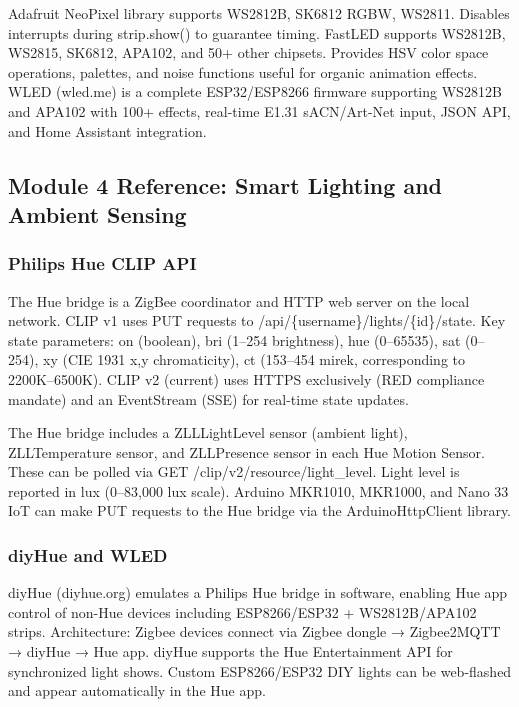 \documentclass[11pt,letterpaper]{article}
\begin{document}
Adafruit NeoPixel library supports WS2812B, SK6812 RGBW, WS2811. Disables interrupts during strip.show() to guarantee timing. FastLED supports WS2812B, WS2815, SK6812, APA102, and 50+ other chipsets. Provides HSV color space operations, palettes, and noise functions useful for organic animation effects. WLED (wled.me) is a complete ESP32/ESP8266 firmware supporting WS2812B and APA102 with 100+ effects, real-time E1.31 sACN/Art-Net input, JSON API, and Home Assistant integration.

\subsection{Module 4 Reference: Smart Lighting and Ambient Sensing}

\subsubsection{Philips Hue CLIP API}

The Hue bridge is a ZigBee coordinator and HTTP web server on the local network. CLIP v1 uses PUT requests to /api/\{username\}/lights/\{id\}/state. Key state parameters: on (boolean), bri (1--254 brightness), hue (0--65535), sat (0--254), xy (CIE 1931 x,y chromaticity), ct (153--454 mirek, corresponding to 2200K--6500K). CLIP v2 (current) uses HTTPS exclusively (RED compliance mandate) and an EventStream (SSE) for real-time state updates.

The Hue bridge includes a ZLLLightLevel sensor (ambient light), ZLLTemperature sensor, and ZLLPresence sensor in each Hue Motion Sensor. These can be polled via GET /clip/v2/resource/light\_level. Light level is reported in lux (0--83,000 lux scale). Arduino MKR1010, MKR1000, and Nano 33 IoT can make PUT requests to the Hue bridge via the ArduinoHttpClient library.

\subsubsection{diyHue and WLED}

diyHue (diyhue.org) emulates a Philips Hue bridge in software, enabling Hue app control of non-Hue devices including ESP8266/ESP32 + WS2812B/APA102 strips. Architecture: Zigbee devices connect via Zigbee dongle → Zigbee2MQTT → diyHue → Hue app. diyHue supports the Hue Entertainment API for synchronized light shows. Custom ESP8266/ESP32 DIY lights can be web-flashed and appear automatically in the Hue app.
\end{document}
